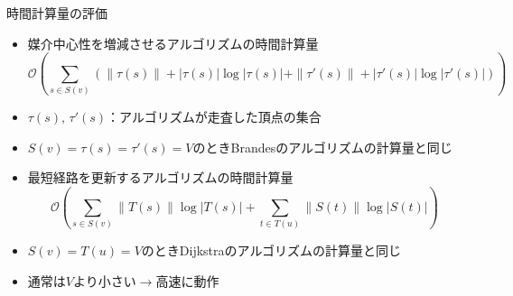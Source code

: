 \documentclass[dvipdfmx,fleqn]{beamer}
\begin{document}
\begin{frame}{時間計算量の評価}
  \begin{itemize}\small
    \item 媒介中心性を増減させるアルゴリズムの時間計算量
    \begin{equation*}
      \mathcal{O}\left(\sum_{s\in S(v)}\left(\|\tau(s)\|+|\tau(s)|\log|\tau(s)|+\|\tau'(s)\|+|\tau'(s)|\log|\tau'(s)|\right)\right)
    \end{equation*}
  \item[] $\tau(s),\,\tau'(s)$：アルゴリズムが走査した頂点の集合
  \item[] \alert{$S(v)=\tau(s)=\tau'(s)=V$}のときBrandesのアルゴリズムの計算量と同じ
    \item 最短経路を更新するアルゴリズムの時間計算量
    \begin{equation*}
      \mathcal{O}\left(\sum_{s\in S(v)}\|T(s)\|\log|T(s)|+\sum_{t\in T(u)}\|S(t)\|\log|S(t)|\right)
    \end{equation*}
  \item[] \alert{$S(v)=T(u)=V$}のときDijkstraのアルゴリズムの計算量と同じ
  \item 通常は$V$より小さい$\rightarrow$\alert{高速に動作}
  \end{itemize}
\end{frame}
\end{document}
